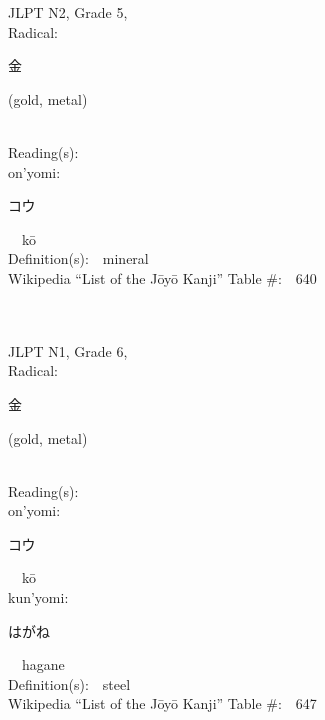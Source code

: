\begin{multicols}{2}
{JLPT N2, Grade 5, \\Radical:\ \ {\begin{CJK}{UTF8}{min} 金 \end{CJK}} (gold, metal) } \\
Reading(s):\ \ \\
{\hspace*{1em}}on'yomi:\ \ \\
{\hspace*{2em}}{\begin{CJK}{UTF8}{min} コウ \end{CJK}}\ \ k\=o\ \ \\
Definition(s):\ \ mineral \\
Wikipedia ``List of the J\=oy\=o Kanji'' Table \#:\ \ 640 \\
\ \ \\
{\fontsize{34pt}{40pt}  }\ \ \\  %
{JLPT N1, Grade 6, \\Radical:\ \ {\begin{CJK}{UTF8}{min} 金 \end{CJK}} (gold, metal) } \\
Reading(s):\ \ \\
{\hspace*{1em}}on'yomi:\ \ \\
{\hspace*{2em}}{\begin{CJK}{UTF8}{min} コウ \end{CJK}}\ \ k\=o\ \ \\
{\hspace*{1em}}kun'yomi:\ \ \\
{\hspace*{2em}}{\begin{CJK}{UTF8}{min} はがね \end{CJK}}\ \ hagane\ \ \\
Definition(s):\ \ steel \\
Wikipedia ``List of the J\=oy\=o Kanji'' Table \#:\ \ 647 \\
\ \ \\
{\fontsize{34pt}{40pt}  }\ \ \\  %

\end{multicols}
